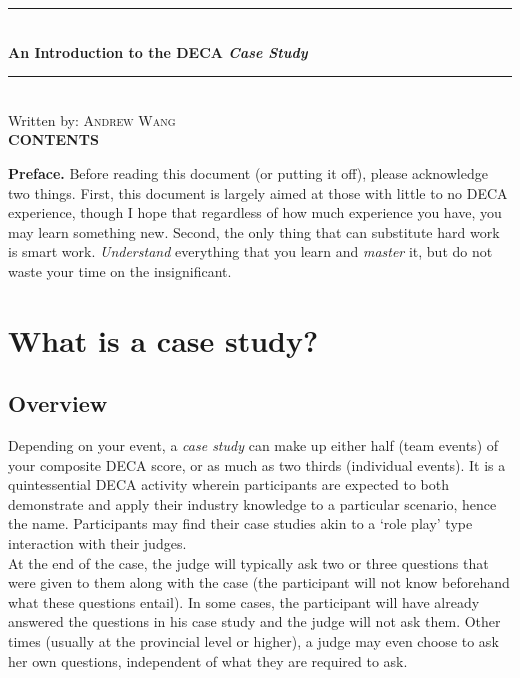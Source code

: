 \documentclass[12pt]{article}
\makeatletter
\newcommand*{\toccontents}{\@starttoc{toc}}
\makeatother
\begin{document}
\thispagestyle{empty}


	\newcommand{\HRule}{\rule{\linewidth}{0.5mm}} 
	\begin{center}

	\HRule\\[0.4cm]
	
	{\huge\bfseries An Introduction to the DECA \textit{Case Study}}\\[0.4cm] 
	
	\HRule\\[0.4cm]
	{Written by: \textsc{Andrew Wang}} \\[1cm]
	{\large\bfseries \textsc{CONTENTS}}\\[0.4cm] 
	\vspace*{.5\baselineskip}
	\toccontents
	\end{center}
	
\vspace*{3\baselineskip}

\textbf{Preface.} Before reading this document (or putting it off), please acknowledge two things. First, this document is largely aimed at those with little to no DECA experience, though I hope that  regardless of how much experience you have, you may learn something new. Second, the only thing that can substitute hard work is smart work. \textit{Understand} everything that you learn and \textit{master} it, but do not waste your time on the insignificant.

\section{What is a case study?}

\subsection{Overview}

	Depending on your event, a \textit{case study} can make up either half (team events) of your composite DECA score, or as much as two thirds (individual events). It is a quintessential DECA activity wherein participants are expected to both demonstrate and apply their industry knowledge to a particular scenario, hence the name. Participants may find their case studies akin to a \lq role play' type interaction with their judges. \\ 
	
	 At the end of the case, the judge will typically ask two or three questions that were given to them along with the case (the participant will not know beforehand what these questions entail). In some cases, the participant will have already answered the questions in his case study and the judge will not ask them. Other times (usually at the provincial level or higher), a judge may even choose to ask her own questions, independent of what they are required to ask. \\
	
\end{document}
